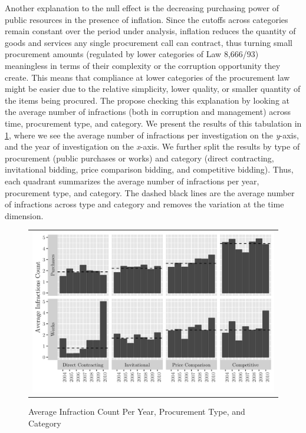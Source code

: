 \documentclass[11pt]{article}
\begin{document}
Another explanation to the null effect is the decreasing purchasing power of public resources in the presence of inflation. Since the cutoffs across categories remain constant over the period under analysis, inflation reduces the quantity of goods and services any single procurement call can contract, thus turning small procurement amounts (regulated by lower categories of Law 8,666/93) meaningless in terms of their complexity or the corruption opportunity they create. This means that compliance at lower categories of the procurement law might be easier due to the relative simplicity, lower quality, or smaller quantity of the items being procured. The propose checking this explanation by looking at the average number of infractions (both in corruption and management) across time, procurement type, and category. We present the results of this tabulation in \ref{fig:02discussion}, where we see the average number of infractions per investigation on the \emph{y}-axis, and the year of investigation on the \emph{x}-axis. We further split the results by type of procurement (public purchases or works) and category (direct contracting, invitational bidding, price comparison bidding, and competitive bidding). Thus, each quadrant summarizes the average number of infractions per year, procurement type, and category. The dashed black lines are the average number of infractions across type and category and removes the variation at the time dimension.

\begin{figure}[!htbp]
  \caption{Average Infraction Count Per Year, Procurement Type, and Category}
  \label{fig:02discussion}
  \centering
  \small
  \begin{tabular}{c}
  \includegraphics[scale = .2]{02discussionplot}
  \end{tabular}
\end{figure}
\end{document}
